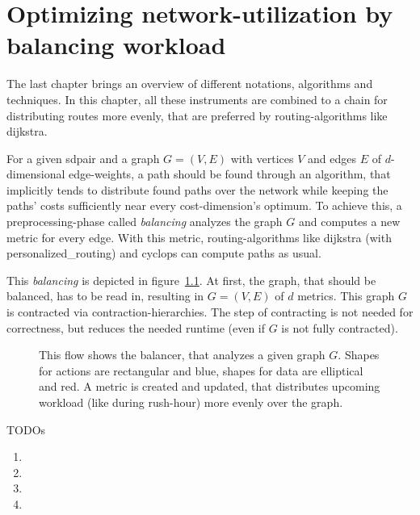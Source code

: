 \chapter{Optimizing network-utilization by balancing workload}
\label{chap:balancing}

The last chapter brings an overview of different notations, algorithms and techniques.
In this chapter, all these instruments are combined to a chain for distributing routes more evenly, that are preferred by routing-algorithms like \gls{dijkstra}.

For a given \gls{sdpair} and a graph $G = (V, E)$ with vertices $V$ and edges $E$ of $d$-dimensional edge-weights, a path should be found through an algorithm, that implicitly tends to distribute found paths over the network while keeping the paths' costs sufficiently near every cost-dimension's optimum.
To achieve this, a preprocessing-phase called \textit{balancing} analyzes the graph $G$ and computes a new metric for every edge.
With this metric, routing-algorithms like \gls{dijkstra}  (with \gls{personalized_routing}) and \gls{cyclops} can compute paths as usual.

This \textit{balancing} is depicted in figure~\ref{fig:balancing}.
At first, the graph, that should be balanced, has to be read in, resulting in $G = (V, E)$ of $d$ metrics.
This graph $G$ is contracted via \gls{contraction-hierarchies}.
The step of contracting is not needed for correctness, but reduces the needed runtime (even if $G$ is not fully contracted).


\begin{figure}
    \centering
    
    \caption[Overview of balancing a graph]{%
        This flow shows the balancer, that analyzes a given graph $G$.
        Shapes for actions are rectangular and blue, shapes for data are elliptical and red.
        A metric is created and updated, that distributes upcoming workload (like during rush-hour) more evenly over the graph.
        \label{fig:balancing}
    }
\end{figure}


TODOs
\begin{enumerate}
    \item {}
    \item {}
    \item {}
    \item {}
\end{enumerate}

